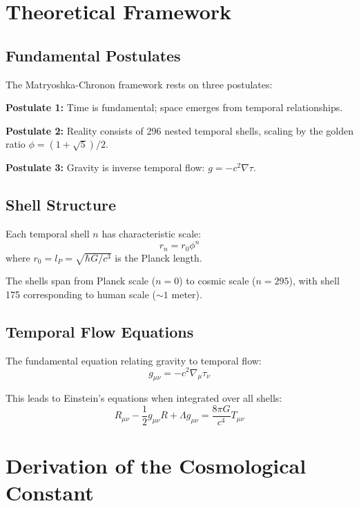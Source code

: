 \documentclass[12pt,a4paper]{article}
\begin{document}
\section{Theoretical Framework}

\subsection{Fundamental Postulates}

The Matryoshka-Chronon framework rests on three postulates:

\textbf{Postulate 1:} Time is fundamental; space emerges from temporal relationships.

\textbf{Postulate 2:} Reality consists of 296 nested temporal shells, scaling by the golden ratio $\phi = (1+\sqrt{5})/2$.

\textbf{Postulate 3:} Gravity is inverse temporal flow: $g = -c^2 \nabla \tau$.

\subsection{Shell Structure}

Each temporal shell $n$ has characteristic scale:
\begin{equation}
r_n = r_0 \phi^n
\end{equation}
where $r_0 = l_P = \sqrt{\hbar G/c^3}$ is the Planck length.

The shells span from Planck scale ($n=0$) to cosmic scale ($n=295$), with shell 175 corresponding to human scale ($\sim 1$ meter).

\subsection{Temporal Flow Equations}

The fundamental equation relating gravity to temporal flow:
\begin{equation}
g_{\mu\nu} = -c^2 \nabla_\mu \tau_\nu
\end{equation}

This leads to Einstein's equations when integrated over all shells:
\begin{equation}
R_{\mu\nu} - \frac{1}{2}g_{\mu\nu}R + \Lambda g_{\mu\nu} = \frac{8\pi G}{c^4}T_{\mu\nu}
\end{equation}

\section{Derivation of the Cosmological Constant}
\end{document}
